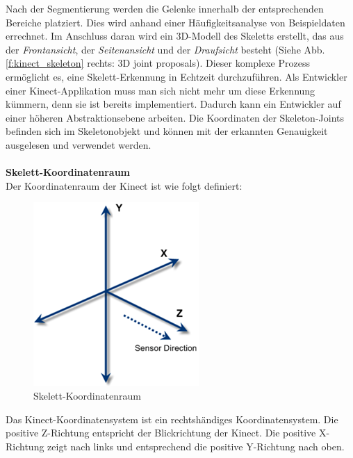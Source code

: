 \noindent
Nach der Segmentierung werden die Gelenke innerhalb der entsprechenden Bereiche platziert. Dies wird anhand einer Häufigkeitsanalyse von Beispieldaten errechnet.
Im Anschluss daran wird ein 3D-Modell des Skeletts erstellt, das aus der \textit{Frontansicht}, der \textit{Seitenansicht} und der \textit{Draufsicht} besteht (Siehe Abb. \ref{f:kinect_skeleton} rechts: 3D joint proposals).
Dieser komplexe Prozess ermöglicht es, eine Skelett-Erkennung in Echtzeit durchzuführen. Als Entwickler einer Kinect-Applikation muss man sich nicht mehr um diese Erkennung kümmern, denn sie ist bereits implementiert. Dadurch kann ein Entwickler auf einer höheren Abstraktionsebene arbeiten. Die Koordinaten der Skeleton-Joints befinden sich im Skeletonobjekt und können mit der erkannten Genauigkeit ausgelesen und verwendet werden.
\\ \\
\textbf{Skelett-Koordinatenraum}\\
Der Koordinatenraum der Kinect ist wie folgt definiert:

\begin{figure}[H]						
	\centering							
	\includegraphics[scale=0.8]{Bilder/kinect_skeleton_space.png}			
	\caption{Skelett-Koordinatenraum\cite{ws:microsoft_coordinateSpaces}}						
	\label{f:kinect_skeleton_space}						
\end{figure}

\noindent
Das Kinect-Koordinatensystem ist ein rechtshändiges Koordinatensystem. Die positive Z-Richtung entspricht der Blickrichtung der Kinect. Die positive X-Richtung zeigt nach links und entsprechend die positive Y-Richtung nach oben. \cite{ws:microsoft_coordinateSpaces}

